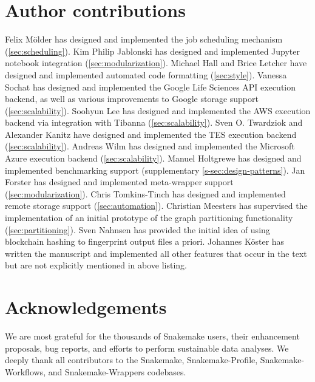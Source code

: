 \documentclass[parskip=half]{scrartcl}
\begin{document}
\section{Author contributions}
Felix Mölder has designed and implemented the job scheduling mechanism (\autoref{sec:scheduling}).
Kim Philip Jablonski has designed and implemented Jupyter notebook integration (\autoref{sec:modularization}).
Michael Hall and Brice Letcher have designed and implemented automated code formatting (\autoref{sec:style}).
Vanessa Sochat has designed and implemented the Google Life Sciences API execution backend, as well as various improvements to Google storage support (\autoref{sec:scalability}).
Soohyun Lee has designed and implemented the AWS execution backend via integration with Tibanna (\autoref{sec:scalability}).
Sven O.
Twardziok and Alexander Kanitz have designed and implemented the TES execution backend (\autoref{sec:scalability}).
Andreas Wilm has designed and implemented the Microsoft Azure execution backend (\autoref{sec:scalability}).
Manuel Holtgrewe has designed and implemented benchmarking support (supplementary \autoref{s-sec:design-patterns}).
Jan Forster has designed and implemented meta-wrapper support (\autoref{sec:modularization}).
Chris Tomkins-Tinch has designed and implemented remote storage support (\autoref{sec:automation}).
Christian Meesters has supervised the implementation of an initial prototype of the graph partitioning functionality (\autoref{sec:partitioning}).
Sven Nahnsen has provided the initial idea of using blockchain hashing to fingerprint output files a priori.
Johannes Köster has written the manuscript and implemented all other features that occur in the text but are not explicitly mentioned in above listing.

\section{Acknowledgements}
We are most grateful for the thousands of Snakemake users, their enhancement proposals, bug reports, and efforts to perform sustainable data analyses.
We deeply thank all contributors to the Snakemake, Snakemake-Profile, Snakemake-Workflows, and Snakemake-Wrappers codebases.

\printbibliography
\end{document}
